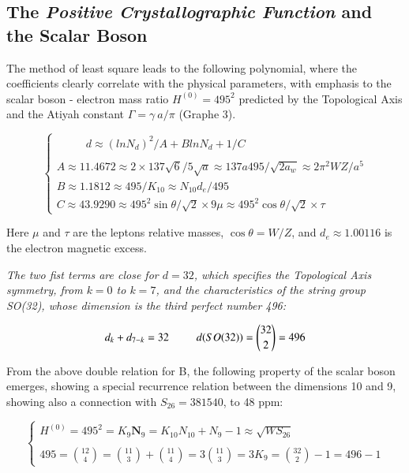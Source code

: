 \documentclass[a4paper,9pt]{article}
\begin{document}

\subsection{The \textit{Positive Crystallographic Function} and the Scalar Boson}

The method of least square leads to the following polynomial, where the coefficients clearly correlate with the physical parameters, with emphasis to the scalar boson - electron mass ratio $H^{(0)} = 495^2$ predicted by the Topological Axis and the Atiyah constant $\Gamma = \gamma~a/\pi$ (Graphe 3).

\begin{equation}\label{Eq23}
 \left\{
    \begin{array}{ll}
        ~~~~~~~~~~~~ d \approx (lnN_d)^2/A + BlnN_d + 1/C\\
        \\
        A\approx 11.4672 \approx 2\times 137 \sqrt 6/5 \sqrt a\approx 137a495/\sqrt{2a_w}  \approx 2\pi^2WZ/a^5\\ 
        B \approx 1.1812 \approx 495/K_{10} \approx N_{10}d_e/495   \\ 
        C\approx 43.9290 \approx 495^2 \sin \theta/\sqrt2 \times 9\mu  \approx 495^2 \cos \theta/\sqrt2\times \tau
    \end{array}
\right.
\end{equation}

Here $\mu$ and $\tau$ are the leptons relative masses, $\cos \theta = W/Z$, and $d_e \approx 1.00116$ is the electron magnetic excess. 

 \textit{The two fist terms are close for $d = 32$, which specifies the Topological Axis symmetry, from $k = 0$ to $k = 7$, and the characteristics of the string group SO(32), whose dimension is the third perfect number 496:}
 
 
 \begin{equation}\label{Eq24}
 d_k + d_{7-k} = 32 ~~~~~~~~~~ d(SO(32)) =  \binom{32}{2} = 496 \\ 
 \end{equation}

From the above double relation for B, the following property of the scalar boson emerges, showing a special recurrence relation between the dimensions 10 and 9, showing also a connection with $S_{26} = 381540$, to 48 ppm:

\begin{equation}\label{Eq25}
 \left\{
    \begin{array}{ll} 
            H^{(0)} = 495^2 = K_{9}\textbf{N}_9 = K_{10} N_{10} + N_{9} - 1 \approx \sqrt{WS_{26}} \\ 
            \\
       495 = \binom{12}{4} = \binom{11}{3} + \binom{11}{4} = 3\binom{11}{3} = 3K_9 = \binom{32}{2} - 1 = 496 -1
    \end{array}
\right.
\end{equation}
\end{document}

